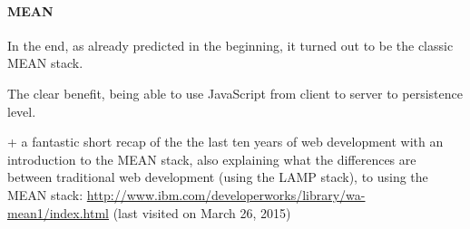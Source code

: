 		\paragraph{MEAN}
			In the end, as already predicted in the beginning, it turned out to be the classic MEAN stack. 

			The clear benefit, being able to use JavaScript from client to server to persistence level. 


			+ a fantastic short recap of the the last ten years of web development with an introduction to the MEAN stack, also explaining what the differences are between traditional web development (using the LAMP stack), to using the MEAN stack:
			\url{http://www.ibm.com/developerworks/library/wa-mean1/index.html} (last visited on March 26, 2015)



\clearpage

\label{sec:implementation:modeling}





